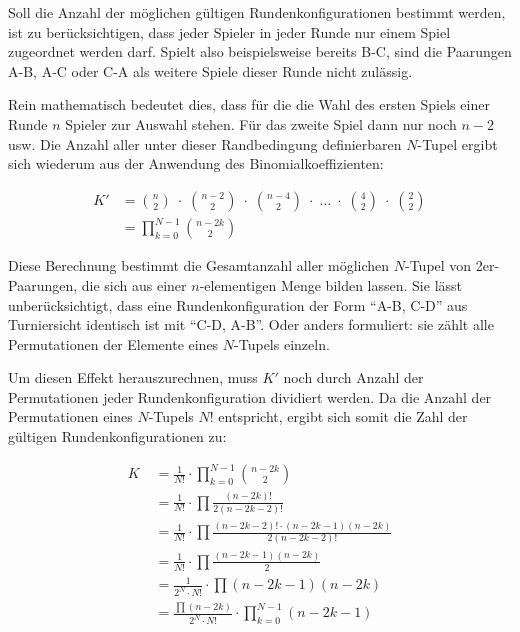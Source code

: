 \documentclass[DIV=15, 10pt]{scrartcl}
\begin{document}
Soll die Anzahl der möglichen gültigen Rundenkonfigurationen bestimmt werden, ist zu berücksichtigen, dass jeder Spieler in jeder Runde nur einem Spiel zugeordnet werden darf. Spielt also beispielsweise bereits B-C, sind die Paarungen A-B, A-C oder C-A als weitere Spiele dieser Runde nicht zulässig.

Rein mathematisch bedeutet dies, dass für die die Wahl des ersten Spiels einer Runde $n$ Spieler zur Auswahl stehen. Für das zweite Spiel dann nur noch $n-2$ usw. Die Anzahl aller unter dieser Randbedingung definierbaren $N$-Tupel ergibt sich wiederum aus der Anwendung des Binomialkoeffizienten:

\begin{align}\label{eqnSizeOfKDash}
K' &= {{n}\choose{2}} \; \cdot \; {{n-2}\choose{2}} \; \cdot \;{{n-4}\choose{2}} \; \cdot \; \ldots
\; \cdot \; {{4}\choose{2}} \; \cdot \; {{2}\choose{2}}\nonumber \\[3mm]
&= \prod_{k = 0}^{N - 1}{{n - 2k}\choose{2}}
\end{align}

Diese Berechnung bestimmt die Gesamtanzahl aller möglichen $N$-Tupel von 2er-Paarungen, die sich aus einer $n$-elementigen Menge bilden lassen. Sie lässt unberücksichtigt, dass eine Rundenkonfiguration der Form "`A-B, C-D"' aus Turniersicht identisch ist mit "`C-D, A-B"'. Oder anders formuliert: sie zählt alle Permutationen der Elemente eines $N$-Tupels einzeln.

Um diesen Effekt herauszurechnen, muss $K'$ noch durch Anzahl der Permutationen jeder Rundenkonfiguration dividiert werden. Da die Anzahl der Permutationen eines $N$-Tupels $N!$ entspricht, ergibt sich somit die Zahl der gültigen Rundenkonfigurationen zu:

\begin{align}\label{eqnComplicated}
K \; &= \frac{1}{N!} \cdot \prod_{k=0}^{N-1}{{n-2k}\choose{2}} \nonumber\\[3mm]
&= \frac{1}{N!} \cdot \prod\frac{(n-2k)!}{2(n - 2k -2)!} \nonumber\\[3mm]
&= \frac{1}{N!} \cdot \prod\frac{(n-2k-2)! \cdot (n-2k-1)(n-2k)}{2(n-2k-2)!} \nonumber\\[3mm]
&= \frac{1}{N!} \cdot \prod\frac{(n-2k-1)(n-2k)}{2} \nonumber\\[3mm]
&= \frac{1}{2^N \cdot N!} \cdot \prod(n - 2k -1)(n - 2k) \nonumber\\[3mm]
&= \frac{\prod(n-2k)}{2^N \cdot N!} \cdot \prod_{k=0}^{N-1}(n - 2k -1)
\end{align}
\end{document}
